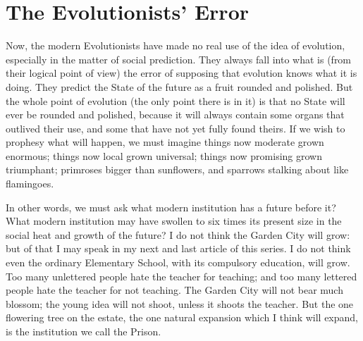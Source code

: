 \documentclass{book}
\begin{document}
\section{The Evolutionists’ Error}
Now, the modern Evolutionists have made no real use of the idea of evolution, especially in the matter of social prediction. They always fall into what is (from their logical point of view) the error of supposing that evolution knows what it is doing. They predict the State of the future as a fruit rounded and polished. But the whole point of evolution (the only point there is in it) is that no State will ever be rounded and polished, because it will always contain some organs that outlived their use, and some that have not yet fully found theirs. If we wish to prophesy what will happen, we must imagine things now moderate grown enormous; things now local grown universal; things now promising grown triumphant; primroses bigger than sunflowers, and sparrows stalking about like flamingoes.

In other words, we must ask what modern institution has a future before it? What modern institution may have swollen to six times its present size in the social heat and growth of the future? I do not think the Garden City will grow: but of that I may speak in my next and last article of this series. I do not think even the ordinary Elementary School, with its compulsory education, will grow. Too many unlettered people hate the teacher for teaching; and too many lettered people hate the teacher for not teaching. The Garden City will not bear much blossom; the young idea will not shoot, unless it shoots the teacher. But the one flowering tree on the estate, the one natural expansion which I think will expand, is the institution we call the Prison.
\end{document}
